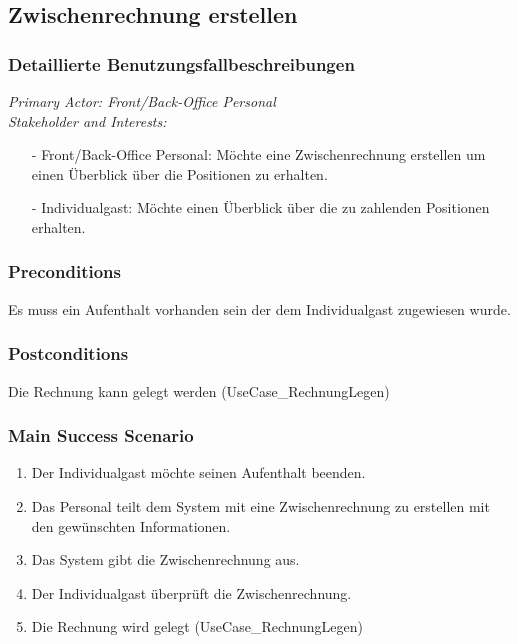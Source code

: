 \documentclass[./detailed_overview_usecases.tex]{subfiles}
\begin{document}
    \subsection{Zwischenrechnung erstellen}
    \subsubsection{Detaillierte Benutzungsfallbeschreibungen}
    \textit{Primary Actor: Front/Back-Office Personal}
    \\
    \textit{Stakeholder and Interests:}
    \begin{itemize}
        \item[-] Front/Back-Office Personal: Möchte eine Zwischenrechnung erstellen um einen Überblick über die Positionen zu erhalten.
        \item[-] Individualgast: Möchte einen Überblick über die zu zahlenden Positionen erhalten.
    \end{itemize}

    \subsubsection*{Preconditions}
    Es muss ein Aufenthalt vorhanden sein der dem Individualgast zugewiesen wurde.

    \subsubsection*{Postconditions}
    Die Rechnung kann gelegt werden (UseCase_RechnungLegen)

    \subsubsection*{Main Success Scenario}
    \begin{enumerate}
        \item Der Individualgast möchte seinen Aufenthalt beenden.
        \item Das Personal teilt dem System mit eine Zwischenrechnung zu erstellen mit den gewünschten Informationen.
        \item Das System gibt die Zwischenrechnung aus.
        \item Der Individualgast überprüft die Zwischenrechnung.
        \item Die Rechnung wird gelegt (UseCase_RechnungLegen)
    \end{enumerate}
\end{document}
